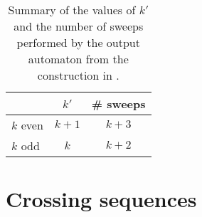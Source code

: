 \begin{table}
	\centering
	\begin{tabular}{lcc}
		\toprule
		~        & $k'$  & \# sweeps \\
		\midrule
		$k$ even & $k+1$ & $k+3$     \\
		$k$ odd  & $k$   & $k+2$     \\
		\bottomrule
	\end{tabular}
	\caption{Summary of the values of $k'$ and the number of sweeps performed by the output automaton from the construction in .}
	\label{tab:kprimesweep}
\end{table}



\section{Crossing sequences}\label{sec:crossseqswdla}


